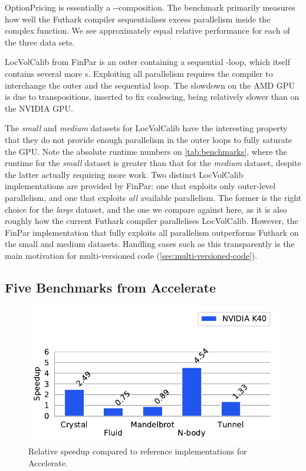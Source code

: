 OptionPricing is essentially a --composition.  The
benchmark primarily measures how well the Futhark compiler
sequentialises excess parallelism inside the complex 
function.  We see approximately equal relative performance for each of
the three data sets.

LocVolCalib from FinPar is an outer  containing a sequential
-loop, which itself contains several more s.
Exploiting all parallelism requires the compiler to interchange the
outer  and the sequential loop.  The slowdown on the AMD GPU
is due to transpositions, inserted to fix coalescing, being relatively
slower than on the NVIDIA GPU.

The \textit{small} and \textit{medium} datasets for LocVolCalib have
the interesting property that they do not provide enough parallelism
in the outer loops to fully saturate the GPU.  Note the absolute
runtime numbers on \cref{tab:benchmarks}, where the runtime for the
\textit{small} dataset is greater than that for the \textit{medium}
dataset, despite the latter actually requiring more work.  Two
distinct LocVolCalib implementations are provided by FinPar: one that
exploits only outer-level parallelism, and one that exploits
\textit{all} available parallelism.  The former is the right choice for
the \textit{large} dataset, and the one we compare against here, as it
is also roughly how the current Futhark compiler parallelises
LocVolCalib.  However, the FinPar implementation that fully exploits
all parallelism outperforms Futhark on the small and medium datasets.
Handling cases such as this transparently is the main motivation for
multi-versioned code (\cref{sec:multi-versioned-code}).

\subsection{Five Benchmarks from Accelerate}
\label{sec:accelerate}

\begin{figure}
  \centering
  \includegraphics[scale=0.65]{experiments/accelerate.pdf}
  \caption{Relative speedup compared to reference implementations for
    Accelerate.}
  \label{fig:accelerate-speedup}
\end{figure}

